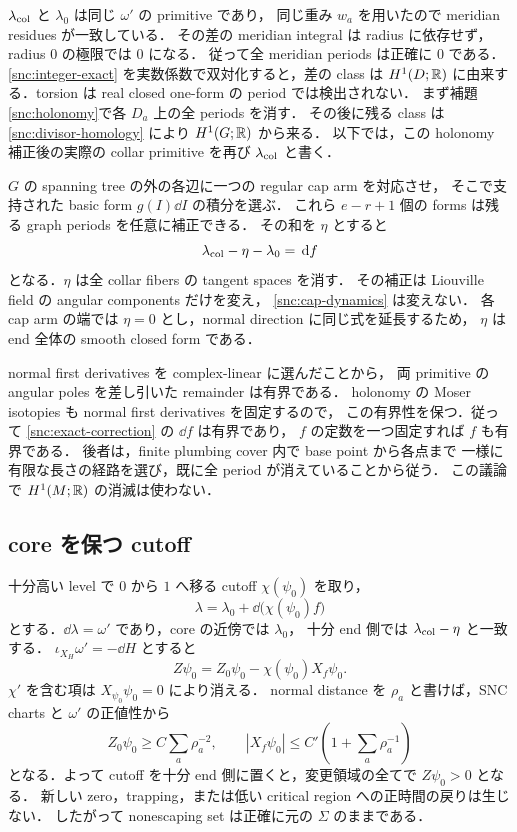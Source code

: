 $\lambda_{\rm col}$ と $\lambda_0$ は同じ $\omega'$ の primitive であり，
同じ重み $w_a$ を用いたので meridian residues が一致している．
その差の meridian integral は radius に依存せず，radius $0$ の極限では $0$ になる．
従って全 meridian periods は正確に $0$ である．
\eqref{snc:integer-exact} を実数係数で双対化すると，差の class は
$H^1(D;\mathbb R)$ に由来する．torsion は real closed one-form の period では検出されない．
まず補題\ref{snc:holonomy}で各 $D_a$ 上の全 periods を消す．
その後に残る class は \eqref{snc:divisor-homology} により $H^1(G;\mathbb R)$ から来る．
以下では，この holonomy 補正後の実際の collar primitive を再び
$\lambda_{\rm col}$ と書く．

$G$ の spanning tree の外の各辺に一つの regular cap arm を対応させ，
そこで支持された basic form $g(I)\dd I$ の積分を選ぶ．
これら $e-r+1$ 個の forms は残る graph periods を任意に補正できる．
その和を $\eta$ とすると
\begin{equation}\label{snc:exact-correction}
 \lambda_{\rm col}-\eta-\lambda_0=\,\mathrm d f
\end{equation}
となる．$\eta$ は全 collar fibers の tangent spaces を消す．
その補正は Liouville field の angular components だけを変え，
\eqref{snc:cap-dynamics} は変えない．
各 cap arm の端では $\eta=0$ とし，normal direction に同じ式を延長するため，
$\eta$ は end 全体の smooth closed form である．

normal first derivatives を complex-linear に選んだことから，
両 primitive の angular poles を差し引いた remainder は有界である．
holonomy の Moser isotopies も normal first derivatives を固定するので，
この有界性を保つ．従って \eqref{snc:exact-correction} の $\dd f$ は有界であり，
$f$ の定数を一つ固定すれば $f$ も有界である．
後者は，finite plumbing cover 内で base point から各点まで
一様に有限な長さの経路を選び，既に全 period が消えていることから従う．
この議論で $H^1(M;\mathbb R)$ の消滅は使わない．

\subsection{core を保つ cutoff}

十分高い level で $0$ から $1$ へ移る cutoff $\chi(\psi_0)$ を取り，
\[
 \lambda=\lambda_0+\dd\bigl(\chi(\psi_0)f\bigr)
\]
とする．$\dd\lambda=\omega'$ であり，core の近傍では $\lambda_0$，
十分 end 側では $\lambda_{\rm col}-\eta$ と一致する．
$\iota_{X_H}\omega'=-\dd H$ とすると
\begin{equation}\label{snc:cutoff-estimate}
 Z\psi_0=Z_0\psi_0-\chi(\psi_0)X_f\psi_0.
\end{equation}
$\chi'$ を含む項は $X_{\psi_0}\psi_0=0$ により消える．
normal distance を $\rho_a$ と書けば，SNC charts と $\omega'$ の正値性から
\[
 Z_0\psi_0\geq C\sum_a\rho_a^{-2},\qquad
 |X_f\psi_0|\leq C'\left(1+\sum_a\rho_a^{-1}\right)
\]
となる．よって cutoff を十分 end 側に置くと，変更領域の全てで $Z\psi_0>0$ となる．
新しい zero，trapping，または低い critical region への正時間の戻りは生じない．
したがって nonescaping set は正確に元の $\Sigma$ のままである．

